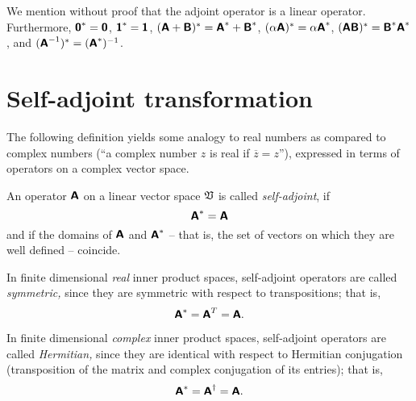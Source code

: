 We mention without proof that the adjoint operator is a linear operator.
Furthermore,
$\textsf{\textbf{0}}^\ast = \textsf{\textbf{0}}$,
$\textsf{\textbf{1}}^\ast = \textsf{\textbf{1}}$,
$(\textsf{\textbf{A}}+\textsf{\textbf{B}})^\ast = \textsf{\textbf{A}}^\ast+\textsf{\textbf{B}}^\ast$,
$(\alpha \textsf{\textbf{A}})^\ast = \alpha \textsf{\textbf{A}}^\ast$,
$( \textsf{\textbf{A}}\textsf{\textbf{B}})^\ast =   \textsf{\textbf{B}}^\ast
 \textsf{\textbf{A}}^\ast$,
and
$( \textsf{\textbf{A}}^{-1})^\ast
=
( \textsf{\textbf{A}}^\ast )^{-1}
$.


\section{Self-adjoint transformation}
\label{2015-m-ch-fdlvs-self-adjoint}



The following definition yields some analogy to real numbers as compared to complex numbers
(``a complex number $z$ is real if $\overline{z}=z$''),
expressed in terms of operators on a complex vector space.


An operator    $\textsf{\textbf{A}}$   on a linear vector space   ${\frak V}$
is called {\em self-adjoint}, if
\begin{equation}
\textsf{\textbf{A}}^{\ast}=
\textsf{\textbf{A}}
\end{equation}
and if the domains of $\textsf{\textbf{A}}$ and $\textsf{\textbf{A}}^{\ast}$
-- that is, the set of vectors on which they are well defined -- coincide.

In finite dimensional {\em real} inner product spaces,
self-adjoint operators are called {\em symmetric,}
since they are symmetric with respect to transpositions; that is,
\begin{equation}
\textsf{\textbf{A}}^{\ast}= \textsf{\textbf{A}}^{T}=
\textsf{\textbf{A}}.
\end{equation}

In finite dimensional
{\em complex} inner product spaces,
self-adjoint operators are called {\em Hermitian,}
since they are identical with respect to Hermitian conjugation (transposition of the matrix and complex conjugation of its
entries); that is,
\begin{equation}
\textsf{\textbf{A}}^{\ast}= \textsf{\textbf{A}}^{\dagger}=
\textsf{\textbf{A}}.
\end{equation}

